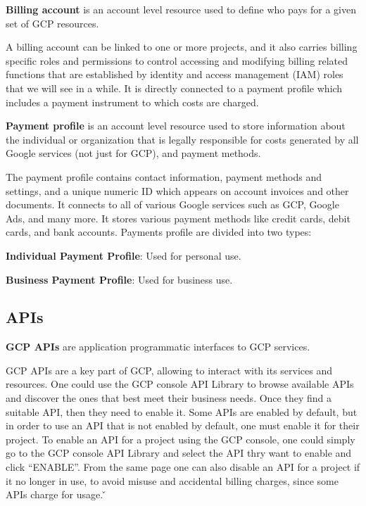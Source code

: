 \textbf{Billing account} is an account level resource used to define who pays for a given set of GCP resources.
\ed

A billing account can be linked to one or more projects, and it also carries billing specific roles and permissions to
control accessing and modifying billing related functions that are established by identity and access management (IAM)
roles that we will see in a while. It is directly connected to a payment profile which includes a payment instrument
to which costs are charged.

\textbf{Payment profile} is an account level resource used to store information about the individual or organization
that is legally responsible for costs generated by all Google services (not just for GCP), and payment methods.
\ed

The payment profile contains contact information, payment methods and settings, and a unique numeric ID which
appears on account invoices and other documents. It connects to all of various Google services such as GCP, Google
Ads, and many more. It stores various payment methods like credit cards, debit cards, and bank accounts. Payments
profile are divided into two types:
\bit
\item \textbf{Individual Payment Profile}: Used for personal use.
\item \textbf{Business Payment Profile}: Used for business use.
\eit

\subsection{APIs}

\textbf{GCP APIs} are application programmatic interfaces to GCP services.
\ed

GCP APIs are a key part of GCP, allowing to interact with its services and resources. One could use the GCP console
API Library to browse available APIs and discover the ones that best meet their business needs. Once they find a
suitable API, then they need to enable it. Some APIs are enabled by default, but in order to use an API that is not
enabled by default, one must enable it for their project. To enable an API for a project using the GCP console, one
could simply go to the GCP console API Library and select the API thry want to enable and click ``ENABLE''. From the
same page one can also disable an API for a project if it no longer in use, to avoid misuse and accidental billing
charges, since some APIs charge for usage. \v

